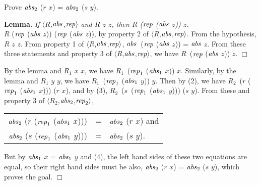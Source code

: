 \documentclass[envcountsame,runningheads]{llncs}
\begin{document}
 Prove ${\it abs}_2$ ($r$ $x$) = ${\it abs}_2$ ($s$ $y$).
\begin{center}
\begin{minipage}{3.8in}
{\bf Lemma.} {\it
If 
$\langle R$,${\it abs}$,${\it rep} \rangle$
and
$R$ $z$ $z$, then {\rm $R$ (${\it rep}$ (${\it abs}$ $z$)) $z$}.
} \\
$R$ (${\it rep}$ (${\it abs}$ $z$)) (${\it rep}$ (${\it abs}$ $z$)),
by property 2 of 
$\langle R$,${\it abs}$,${\it rep} \rangle$.
From the hypothesis,
$R$ $z$ $z$.
From property 1 of
$\langle R$,${\it abs}$,${\it rep} \rangle$,
\linebreak[3]
${\it abs}$~(${\it rep}$ (${\it abs}$ $z$)) = ${\it abs}$ $z$.
From these three statements and property 3 of
$\langle R$,${\it abs}$,${\it rep} \rangle$,
we have
$R$~(${\it rep}$ (${\it abs}$ $z$)) $z$.
%
$\Box$
\end{minipage}
\end{center}

By the lemma and $R_1$ $x$ $x$, we have 
$R_1$~(${\it rep}_1$ (${\it abs}_1$ $x$)) $x$.
Similarly, 
by the lemma and $R_1$ $y$ $y$, we have 
$R_1$~(${\it rep}_1$ (${\it abs}_1$ $y$)) $y$.
Then by (2), we have
\linebreak[3]
$R_2$~($r$ (${\it rep}_1$ (${\it abs}_1$ $x$))) ($r$ $x$), and
by (3),
$R_2$~($s$~(${\it rep}_1$ (${\it abs}_1$ $y$))) ($s$ $y$).
From these and property 3 of
$\langle R_2$,${\it abs}_2$,${\it rep}_2 \rangle$,
\begin{center}
\begin{tabular}{rcl}
${\it abs}_2$ ($r$ (${\it rep}_1$ (${\it abs}_1$ $x$)))
& = & ${\it abs}_2$ ($r$ $x$)
and \\
${\it abs}_2$ ($s$ (${\it rep}_1$ (${\it abs}_1$ $y$)))
& = & ${\it abs}_2$ ($s$ $y$).
\end{tabular}
\end{center}
But by ${\it abs}_1$ $x$ = ${\it abs}_1$ $y$ and (4),
the left hand sides of these two equations are equal, so
their right hand sides must be also,
${\it abs}_2$ ($r$ $x$) = ${\it abs}_2$ ($s$ $y$), which proves the goal.
$\Box$
\end{document}

